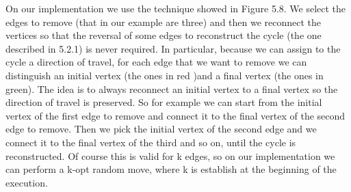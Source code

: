 \noindent On our implementation we use the technique showed in Figure 5.8. We select the edges to remove (that in our example are three) and then we reconnect the vertices so that the reversal of some edges to reconstruct the cycle (the one described in 5.2.1) is never required. In particular, because we can assign to the cycle a direction of travel, for each edge that we want to remove we can distinguish an initial vertex (the ones in red )and a final vertex (the ones in green). The idea is to always reconnect an initial vertex to a final vertex so the direction of travel is preserved. So for example we can start from the initial vertex of the first edge to remove and connect it to the final vertex of the second edge to remove. Then we pick the initial vertex of the second edge and we connect it to the final vertex of the third and so on, until the cycle is reconstructed. Of course this is valid for k edges, so on our implementation we can perform a k-opt random move, where k is establish at the beginning of the execution.

